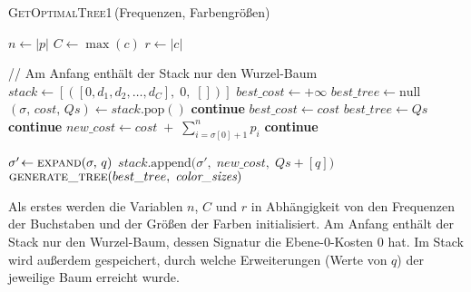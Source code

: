 \documentclass[a4paper,10pt,ngerman]{scrartcl}
\begin{document}
    \begin{algorithm} [H]
        \caption{\textsc{GetOptimalTree1}\,(Frequenzen, Farbengrößen)}
        \label{alg:optimal_tree}
        \begin{algorithmic}[1]
                \State $n \gets |p|$  
                \State $C \gets \max(c)$ 
                \State $r \gets |c|$  

                \State // Am Anfang enthält der Stack nur den Wurzel-Baum
                \State $stack \gets [([0, d_1, d_2, \dots, d_C],\;0,\;[])]$ 
                \State $best\_cost \gets +\infty$
                \State $best\_tree \gets \text{null}$
                    \State $(\sigma,\,cost,\,Qs) \gets stack.\mathrm{pop}()$
                        \State \textbf{continue}
                    \EndIf
                            \State $best\_cost \gets cost$
                            \State $best\_tree \gets Qs$
                        \EndIf
                        \State \textbf{continue}
                    \EndIf
                    \State $new\_cost \gets cost \;+\;\sum_{i=\sigma[0]+1}^{n} p_i$
                        \State \textbf{continue}
                    \EndIf


                        \State $\sigma'\!\gets \textsc{expand}(\sigma,\,q)$
                        \State $stack.\mathrm{append}\bigl(\sigma',\;new\_cost,\;Qs + [q]\bigr)$
                    \EndFor
                \EndWhile
                \State \Return $\textsc{generate\_tree}(best\_tree,\;\textit{color\_sizes})$
            \EndFunction
        \end{algorithmic}
    \end{algorithm}
    Als erstes werden die Variablen $n$, $C$ und $r$ in Abhängigkeit von den Frequenzen der Buchstaben und der Größen der Farben initialisiert.
    Am Anfang enthält der Stack nur den Wurzel-Baum, dessen Signatur die Ebene-0-Kosten 0 hat.
    Im Stack wird außerdem gespeichert, durch welche Erweiterungen (Werte von $q$) der jeweilige Baum erreicht wurde.
\end{document}
